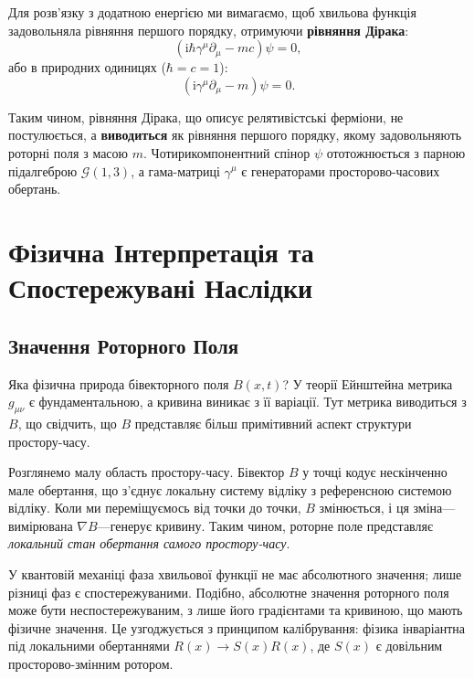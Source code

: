 \documentclass[11pt,a4paper]{article}
\numberwithin{equation}{section}
\theoremstyle{plain}
\theoremstyle{definition}
\theoremstyle{remark}
\newcommand{\ii}{\mathrm{i}}
\begin{document}
Для розв'язку з додатною енергією ми вимагаємо, щоб хвильова функція задовольняла рівняння першого порядку, отримуючи \textbf{рівняння Дірака}:
\begin{equation}
(\ii\hbar\gamma^\mu \partial_\mu - mc)\psi = 0,
\label{eq:dirac}
\end{equation}
або в природних одиницях ($\hbar = c = 1$):
\begin{equation}
(\ii\gamma^\mu \partial_\mu - m)\psi = 0.
\end{equation}

Таким чином, рівняння Дірака, що описує релятивістські ферміони, не постулюється, а \textbf{виводиться} як рівняння першого порядку, якому задовольняють роторні поля з масою $m$. Чотирикомпонентний спінор $\psi$ ототожнюється з парною підалгеброю $\mathcal{G}(1,3)$, а гама-матриці $\gamma^\mu$ є генераторами просторово-часових обертань.

\section{Фізична Інтерпретація та Спостережувані Наслідки}
\label{sec:physical}

\subsection{Значення Роторного Поля}

Яка фізична природа бівекторного поля $B(x,t)$? У теорії Ейнштейна метрика $g_{\mu\nu}$ є фундаментальною, а кривина виникає з її варіації. Тут метрика виводиться з $B$, що свідчить, що $B$ представляє більш примітивний аспект структури простору-часу.

Розглянемо малу область простору-часу. Бівектор $B$ у точці кодує нескінченно мале обертання, що з'єднує локальну систему відліку з референсною системою відліку. Коли ми переміщуємось від точки до точки, $B$ змінюється, і ця зміна---вимірювана $\nabla B$---генерує кривину. Таким чином, роторне поле представляє \emph{локальний стан обертання самого простору-часу}.

У квантовій механіці фаза хвильової функції не має абсолютного значення; лише різниці фаз є спостережуваними. Подібно, абсолютне значення роторного поля може бути неспостережуваним, з лише його градієнтами та кривиною, що мають фізичне значення. Це узгоджується з принципом калібрування: фізика інваріантна під локальними обертаннями $R(x) \to S(x)R(x)$, де $S(x)$ є довільним просторово-змінним ротором.
\end{document}
